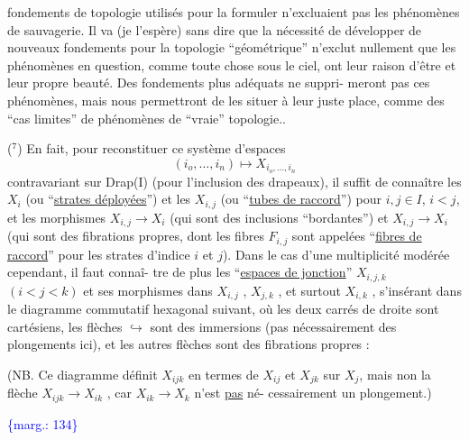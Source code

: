 \documentclass[11pt]{article}
\newcommand{\scanpage}[1]{\par\bigskip\noindent{\small\sffamily[scan #1]}\par}
\newcommand{\mspage}[1]{{\small\sffamily[p.\,#1]}}
\newcommand{\margin}[1]{\textcolor{blue}{\{\textsf{marg.:} #1\}}}
\newcommand{\uline}[1]{\underline{#1}}
\newenvironment{diagramblock}{\par\begin{center}}{\end{center}\par}
\begin{document}
fondements de topologie utilisés pour la formuler n'excluaient
pas les phénomènes de sauvagerie. Il va (je l'espère) sans dire
que la nécessité de développer de nouveaux fondements pour la
topologie ``géométrique'' n'exclut nullement que les phénomènes en
question, comme toute chose sous le ciel, ont leur raison d'être
et leur propre beauté. Des fondements plus adéquats ne suppri-%
meront pas ces phénomènes, mais nous permettront de les situer à
leur juste place, comme des ``cas limites'' de phénomènes de ``vraie''
topologie..

($^7$) En fait, pour reconstituer ce système d'espaces
\[ (i_o,\ldots,i_n) \longmapsto X_{i_o,\ldots,i_n} \]
contravariant sur Drap(I) (pour l'inclusion des drapeaux), il
suffit de connaître les $X_i$ (ou ``\uline{strates déployées}'') et les $X_{i,j}$
(ou ``\uline{tubes de raccord}'') pour $i,j \in I$, $i < j$, et les morphismes
$X_{i,j} \longrightarrow X_i$ (qui sont des inclusions ``bordantes'') et $X_{i,j} \rightarrow X_i$
(qui sont des fibrations propres, dont les fibres $F_{i,j}$ sont
appelées ``\uline{fibres de raccord}'' pour les strates d'indice $i$ et $j$).
Dans le cas d'une multiplicité modérée cependant, il faut connaî-%
tre de plus les ``\uline{espaces de jonction}'' $X_{i,j,k}$ $(i < j < k)$ et ses
morphismes dans $X_{i,j}$ , $X_{j,k}$ , et surtout $X_{i,k}$ , s'insérant dans
le diagramme commutatif hexagonal suivant, où les deux carrés de
droite sont cartésiens, les flèches $\hookrightarrow$ sont des immersions (pas
nécessairement des plongements ici), et les autres flèches sont
des fibrations propres :

\begin{diagramblock}
\end{diagramblock}

(NB. Ce diagramme définit $X_{ijk}$ en termes de $X_{ij}$ et $X_{jk}$ sur $X_j$,
mais non la flèche $X_{ijk} \longrightarrow X_{ik}$ , car $X_{ik} \longrightarrow X_k$ n'est \uline{pas} né-%
cessairement un plongement.)

\margin{134}

\clearpage
\scanpage{119/135}
\mspage{57}
\end{document}
